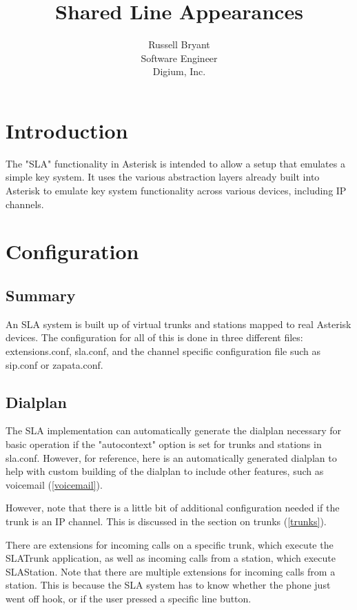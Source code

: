 \documentclass[12pt,a4]{article}
\author{Russell Bryant \\ Software Engineer \\  Digium, Inc.}
\title{Shared Line Appearances}
\begin{document}
\maketitle

\tableofcontents

\section{Introduction}

The "SLA" functionality in Asterisk is intended to allow a setup that emulates
a simple key system.  It uses the various abstraction layers already built into
Asterisk to emulate key system functionality across various devices, including
IP channels.

\section{Configuration}

\subsection{Summary}

An SLA system is built up of virtual trunks and stations mapped to real
Asterisk devices.  The configuration for all of this is done in three
different files: extensions.conf, sla.conf, and the channel specific
configuration file such as sip.conf or zapata.conf.

\subsection{Dialplan}

The SLA implementation can automatically generate the dialplan necessary for
basic operation if the "autocontext" option is set for trunks and stations in
sla.conf.  However, for reference, here is an automatically generated dialplan
to help with custom building of the dialplan to include other features, such as
voicemail (\ref{voicemail}).

However, note that there is a little bit of additional configuration needed if
the trunk is an IP channel.  This is discussed in the section on trunks (\ref{trunks}).

There are extensions for incoming calls on a specific trunk, which execute the SLATrunk
application, as well as incoming calls from a station, which execute SLAStation.
Note that there are multiple extensions for incoming calls from a station.  This is
because the SLA system has to know whether the phone just went off hook, or if the
user pressed a specific line button.
\end{document}
